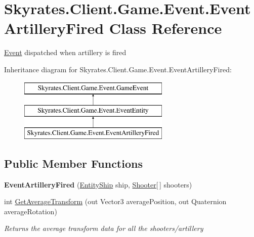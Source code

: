 \hypertarget{class_skyrates_1_1_client_1_1_game_1_1_event_1_1_event_artillery_fired}{\section{Skyrates.\-Client.\-Game.\-Event.\-Event\-Artillery\-Fired Class Reference}
\label{class_skyrates_1_1_client_1_1_game_1_1_event_1_1_event_artillery_fired}
}


\hyperlink{namespace_skyrates_1_1_client_1_1_game_1_1_event}{Event} dispatched when artillery is fired  


Inheritance diagram for Skyrates.\-Client.\-Game.\-Event.\-Event\-Artillery\-Fired\-:\begin{figure}[H]
\begin{center}
\leavevmode
\includegraphics[height=3.000000cm]{class_skyrates_1_1_client_1_1_game_1_1_event_1_1_event_artillery_fired}
\end{center}
\end{figure}
\subsection*{Public Member Functions}
\begin{DoxyCompactItemize}
\item 
\hypertarget{class_skyrates_1_1_client_1_1_game_1_1_event_1_1_event_artillery_fired_a24dc075d0ff12e05a7b9d81cf3262758}{{\bfseries Event\-Artillery\-Fired} (\hyperlink{class_skyrates_1_1_client_1_1_entity_1_1_entity_ship}{Entity\-Ship} ship, \hyperlink{class_skyrates_1_1_client_1_1_mono_1_1_shooter}{Shooter}\mbox{[}$\,$\mbox{]} shooters)}\label{class_skyrates_1_1_client_1_1_game_1_1_event_1_1_event_artillery_fired_a24dc075d0ff12e05a7b9d81cf3262758}

\item 
int \hyperlink{class_skyrates_1_1_client_1_1_game_1_1_event_1_1_event_artillery_fired_a58bb7b842dad16ff93c6702295648238}{Get\-Average\-Transform} (out Vector3 average\-Position, out Quaternion average\-Rotation)
\begin{DoxyCompactList}\small\item\em Returns the average transform data for all the shooters/artillery \end{DoxyCompactList}\end{DoxyCompactItemize}
